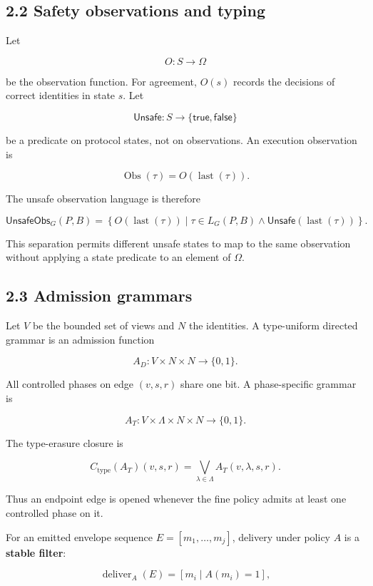 \documentclass[10pt,a4paper]{article}
\begin{document}
\subsection{2.2 Safety observations and
typing}\label{safety-observations-and-typing}

Let

\[
O:S\to\Omega
\]

be the observation function. For agreement, \(O(s)\) records the
decisions of correct identities in state \(s\). Let

\[
\mathsf{Unsafe}:S\to\{\mathsf{true},\mathsf{false}\}
\]

be a predicate on protocol states, not on observations. An execution
observation is

\[
\operatorname{Obs}(\tau)=O(\operatorname{last}(\tau)).
\]

The unsafe observation language is therefore

\[
\mathsf{UnsafeObs}_G(P,B)=
\left\{
O(\operatorname{last}(\tau))
\mid
\tau\in L_G(P,B)\land
\mathsf{Unsafe}(\operatorname{last}(\tau))
\right\}.
\]

This separation permits different unsafe states to map to the same
observation without applying a state predicate to an element of
\(\Omega\).

\subsection{2.3 Admission grammars}\label{admission-grammars}

Let \(V\) be the bounded set of views and \(N\) the identities. A
type-uniform directed grammar is an admission function

\[
A_D:V\times N\times N\to\{0,1\}.
\]

All controlled phases on edge \((v,s,r)\) share one bit. A
phase-specific grammar is

\[
A_T:V\times\Lambda\times N\times N\to\{0,1\}.
\]

The type-erasure closure is

\[
C_{\mathrm{type}}(A_T)(v,s,r)
=
\bigvee_{\lambda\in\Lambda}A_T(v,\lambda,s,r).
\]

Thus an endpoint edge is opened whenever the fine policy admits at least
one controlled phase on it.

For an emitted envelope sequence \(E=[m_1,\ldots,m_j]\), delivery under
policy \(A\) is a \textbf{stable filter}:

\[
\operatorname{deliver}_A(E)
=
[m_i\mid A(m_i)=1],
\]
\end{document}
